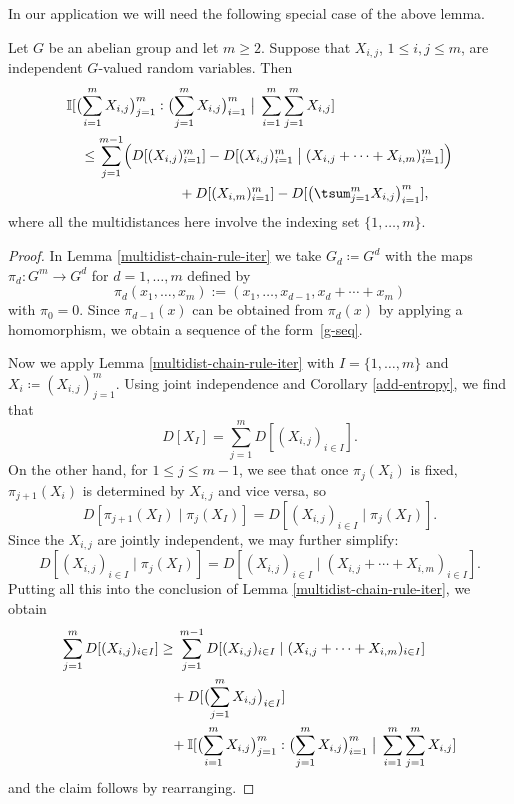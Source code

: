   In our application we will need the following special case of the above lemma.

  \begin{corollary}\label{cor-multid} Let $G$ be an abelian group and let $m \geq 2$.  Suppose that $X_{i,j}$, $1 \leq i, j \leq m$, are independent $G$-valued random variables.
    Then
    \begin{align*}
      &\bbI[ \bigl(\sum_{i=1}^m X_{i,j}\bigr)_{j =1}^{m} : \bigl(\sum_{j=1}^m X_{i,j}\bigr)_{i = 1}^m \; \big| \; \sum_{i=1}^m \sum_{j = 1}^m  X_{i,j} ] \\
      &\quad \leq \sum_{j=1}^{m-1} \Bigl(D[(X_{i, j})_{i = 1}^m] - D[ (X_{i, j})_{i = 1}^m  \; \big| \; (X_{i,j} + \cdots + X_{i,m})_{i =1}^m ]\Bigr) \\ & \qquad\qquad\qquad\qquad +  D[(X_{i,m})_{i=1}^m] - D[ \bigl(\tsum_{j=1}^m X_{i,j}\bigr)_{i=1}^m ],
    \end{align*}
  where all the multidistances here involve the indexing set $\{1,\dots, m\}$.
  \end{corollary}

  \begin{proof}
    In Lemma \ref{multidist-chain-rule-iter} we take $G_d \coloneqq G^d$ with the maps $\pi_d \colon G^m \to G^d$ for $d=1,\dots,m$ defined by
  \[
    \pi_d(x_1,\dots,x_m) := (x_1,\dots,x_{d-1}, x_d + \cdots + x_m)
  \]
  with $\pi_0=0$. Since $\pi_{d-1}(x)$ can be obtained from $\pi_{d}(x)$ by applying a homomorphism, we obtain a sequence of the form~\eqref{g-seq}.

  Now we apply Lemma \ref{multidist-chain-rule-iter} with $I = \{1,\dots, m\}$ and $X_i \coloneqq (X_{i,j})_{j = 1}^m$.  Using joint independence and Corollary \ref{add-entropy}, we find that
  \[
    D[ X_{I} ] = \sum_{j=1}^m D[ (X_{i,j})_{i \in I} ].
  \]
  On the other hand, for $1 \leq j \leq m-1$, we see that once $\pi_{j}(X_i)$ is fixed, $\pi_{j+1}(X_i)$ is determined by $X_{i, j}$ and vice versa, so
  \[
    D[ \pi_{j+1}(X_{I}) \; | \; \pi_{j}(X_{I}) ] = D[ (X_{i, j})_{i \in I} \; | \; \pi_{j}(X_{I} )].
  \]
  Since the $X_{i,j}$ are jointly independent, we may further simplify:
  \[
    D[ (X_{i, j})_{i \in I} \; | \; \pi_{j}(X_{I})] = D[ (X_{i,j})_{i \in I} \; | \; ( X_{i, j} + \cdots + X_{i, m})_{i \in I} ].
  \]
  Putting all this into the conclusion of Lemma \ref{multidist-chain-rule-iter}, we obtain
  \[
    \sum_{j=1}^{m} D[ (X_{i,j})_{i \in I} ]
    \geq
    \begin{aligned}[t]
    &\sum_{j=1}^{m-1} D[ (X_{i,j})_{i \in I} \; | \; (X_{i,j} + \cdots + X_{i,m})_{i \in I} ] \\
    &\!\!\!+
    D[ \bigl(\sum_{j=1}^m X_{i,j}\bigr)_{i \in I}] \\
    &\!\!\!+\mathbb{I}[  \bigl(\sum_{i=1}^m X_{i,j}\bigr)_{j =1}^{m} : \bigl(\sum_{j=1}^m X_{i,j}\bigr)_{i = 1}^m \; \big| \; \sum_{i=1}^m \sum_{j = 1}^m  X_{i,j} ]
    \end{aligned}
  \]
  and the claim follows by rearranging.
\end{proof}

